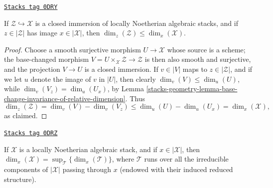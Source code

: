 \begin{lemma}
\label{stacks-geometry-lemma-closed-immersions}
\href{https://stacks.math.columbia.edu/tag/0DRY}{\texttt{Stacks tag 0DRY}}

If $\mathcal{Z} \hookrightarrow \mathcal{X}$ is a closed immersion
of locally Noetherian algebraic stacks,
and if $z \in |\mathcal{Z}|$ has image $x \in |\mathcal{X}|$,
then $\dim_z (\mathcal{Z}) \leq \dim_x(\mathcal{X})$.
\end{lemma}

\begin{proof}
Choose a smooth surjective morphism
$U\to \mathcal{X}$ whose source is a scheme;
the base-changed morphism
$V = U\times_{\mathcal{X}} \mathcal{Z} \to \mathcal{Z}$
is then also smooth and surjective, and the projection
$V \to U$ is a closed immersion.
If $v \in |V|$ maps to $z \in |\mathcal{Z}|$, and
if we let $u$ denote the image of $v$ in $|U|$,
then clearly
$\dim_v(V) \leq \dim_u(U)$,
while
$\dim_v (V_z) = \dim_u(U_x)$,
by Lemma \ref{stacks-geometry-lemma-base-change-invariance-of-relative-dimension}.
Thus
$$
\dim_z(\mathcal{Z})  = \dim_v(V) - \dim_v(V_z)
\leq \dim_u(U) - \dim_u(U_x) = \dim_x(\mathcal{X}),
$$
as claimed.
\end{proof}

\begin{lemma}
\label{stacks-geometry-lemma-dimension-via-components}
\href{https://stacks.math.columbia.edu/tag/0DRZ}{\texttt{Stacks tag 0DRZ}}

If $\mathcal{X}$ is a locally Noetherian algebraic stack, and if
$x \in |\mathcal{X}|$,
then $\dim_x(\mathcal{X}) = \sup_{\mathcal{T}} \{ \dim_x(\mathcal{T}) \} $,
where $\mathcal{T}$ runs over all the irreducible components
of $|\mathcal{X}|$ passing through $x$ (endowed with their
induced reduced structure).
\end{lemma}

